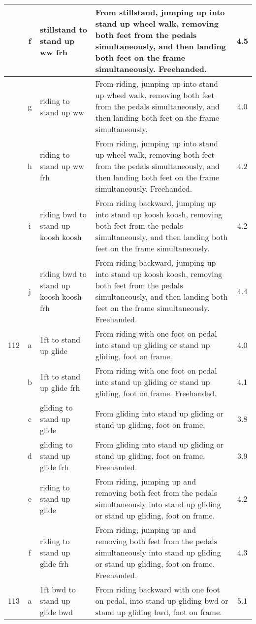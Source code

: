 \begin{longtable}{|r|c|p{4cm}|p{8cm}|c|}
\hline
  & f & stillstand to stand up ww frh & From stillstand, jumping up into stand up wheel walk, removing both feet from the pedals simultaneously, and then landing both feet on the frame simultaneously. Freehanded.  & 4.5 \\ 
\hline
  & g & riding to stand up ww & From riding, jumping up into stand up wheel walk, removing both feet from the pedals simultaneously, and then landing both feet on the frame simultaneously.  & 4.0 \\ 
\hline
  & h & riding to stand up ww frh & From riding, jumping up into stand up wheel walk, removing both feet from the pedals simultaneously, and then landing both feet on the frame simultaneously. Freehanded.  & 4.2 \\ 
\hline
  & i & riding bwd to stand up koosh koosh  & From riding backward, jumping up into stand up koosh koosh, removing both feet from the pedals simultaneously, and then landing both feet on the frame simultaneously.  & 4.2 \\ 
\hline
  & j & riding bwd to stand up koosh koosh frh  & From riding backward, jumping up into stand up koosh koosh, removing both feet from the pedals simultaneously, and then landing both feet on the frame simultaneously. Freehanded.  & 4.4 \\ 
\hline
112 & a & 1ft to stand up glide & From riding with one foot on pedal into stand up gliding or stand up gliding, foot on frame.  & 4.0 \\ 
\hline
  & b & 1ft to stand up glide frh & From riding with one foot on pedal into stand up gliding or stand up gliding, foot on frame. Freehanded.  & 4.1 \\ 
\hline
  & c & gliding to stand up glide & From gliding into stand up gliding or stand up gliding, foot on frame.  & 3.8 \\ 
\hline
  & d & gliding to stand up glide frh & From gliding into stand up gliding or stand up gliding, foot on frame. Freehanded.  & 3.9 \\ 
\hline
  & e & riding to stand up glide  & From riding, jumping up and removing both feet from the pedals simultaneously into stand up gliding or stand up gliding, foot on frame. & 4.2 \\ 
\hline
  & f & riding to stand up glide frh  & From riding, jumping up and removing both feet from the pedals simultaneously into stand up gliding or stand up gliding, foot on frame. Freehanded. & 4.3 \\ 
\hline
113 & a & 1ft bwd to stand up glide bwd & From riding backward with one foot on pedal, into stand up gliding bwd or stand up gliding bwd, foot on frame.  & 5.1 \\ 

\end{longtable}
